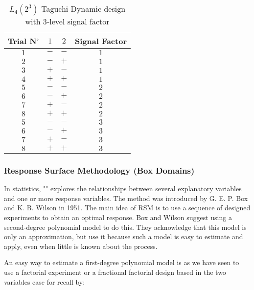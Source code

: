 	\begin{table}[H]\centering
	\begin{center}
		\begin{tabular}{|c|c|c|c|}
		\hline
		\multicolumn{1}{c}{\cellcolor{black!30}\textbf{Trial N${}^\circ$}} & 
  \multicolumn{1}{c}{\cellcolor{black!30}$1$} & 
  \multicolumn{1}{c}{\cellcolor{black!30}$2$}  & 
  \multicolumn{1}{c}{\cellcolor{black!30}Signal Factor}  \\ \hline
		$1$ & $-$ & $-$ & $1$ \\ \hline
		$2$ & $-$ & $+$ & $1$ \\ \hline
		$3$ & $+$ & $-$ & $1$ \\ \hline
		$4$ & $+$ & $+$ & $1$ \\ \hline
		$5$ & $-$ & $-$ & $2$ \\ \hline
		$6$ & $-$ & $+$ & $2$ \\ \hline
		$7$ & $+$ & $-$ & $2$ \\ \hline
		$8$ & $+$ & $+$ & $2$ \\ \hline
		$5$ & $-$ & $-$ & $3$ \\ \hline
		$6$ & $-$ & $+$ & $3$ \\ \hline
		$7$ & $+$ & $-$ & $3$ \\ \hline
		$8$ & $+$ & $+$ & $3$ \\ \hline
 		\end{tabular}
	\end{center}
	\caption{$L_4(2^3)$ Taguchi Dynamic design with $3$-level signal factor}
	\end{table}
	
	\pagebreak
	\subsubsection{Response Surface Methodology (Box Domains)}
	In statistics, "" explores the relationships between several explanatory variables and one or more response variables. The method was introduced by G. E. P. Box and K. B. Wilson in 1951. The main idea of RSM is to use a sequence of designed experiments to obtain an optimal response. Box and Wilson suggest using a second-degree polynomial model to do this. They acknowledge that this model is only an approximation, but use it because such a model is easy to estimate and apply, even when little is known about the process.
	
	An easy way to estimate a first-degree polynomial model is as we have seen to use a factorial experiment or a fractional factorial design based in the two variables case for recall by:
	
